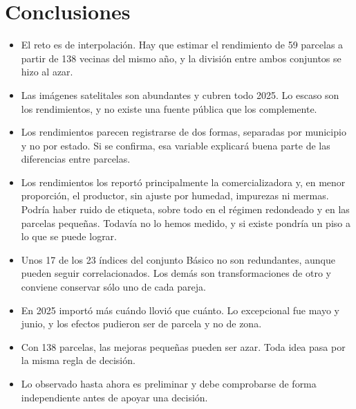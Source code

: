 \section{Conclusiones}\label{sec:conclusiones}

\begin{itemize}
  \item El reto es de interpolación. Hay que estimar el rendimiento de 59 parcelas a partir de 138 vecinas del mismo
        año, y la división entre ambos conjuntos se hizo al azar.
  \item Las imágenes satelitales son abundantes y cubren todo 2025. Lo escaso son los rendimientos, y no existe una
        fuente pública que los complemente.
  \item Los rendimientos parecen registrarse de dos formas, separadas por municipio y no por estado. Si se
        confirma, esa variable explicará buena parte de las diferencias entre parcelas.
  \item Los rendimientos los reportó principalmente la comercializadora y, en menor proporción, el productor, sin ajuste por humedad, impurezas ni mermas. Podría haber ruido de etiqueta, sobre todo en el régimen redondeado y en las parcelas pequeñas. Todavía no lo hemos medido, y si existe pondría un piso a lo que se puede lograr.
  \item Unos 17 de los 23 índices del conjunto Básico no son redundantes, aunque pueden seguir correlacionados. Los demás son transformaciones de otro y conviene conservar sólo uno de cada pareja.
  \item En 2025 importó más cuándo llovió que cuánto. Lo excepcional fue mayo y junio, y los efectos pudieron ser de parcela y no de zona.
  \item Con 138 parcelas, las mejoras pequeñas pueden ser azar. Toda idea pasa por la misma regla de decisión.
  \item Lo observado hasta ahora es preliminar y debe comprobarse de forma independiente antes de apoyar una
        decisión.
\end{itemize}
